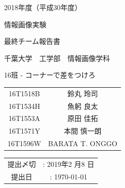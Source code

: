 


\begin{titlepage}
	\centering
	{\Large 2018年度（平成30年度） \par
	\Huge 情報画像実験 \par
	\Large 最終チーム報告書 \par}
	
	\vspace{5cm}
	{\LARGE 千葉大学　工学部　情報画像学科\par
	\Large 16班 - コーナーで差をつけろ\par
	
	\begin{table}[!h]
	\centering
	\large
	\begin{tabular}{cc}
	16T1518B & 鈴丸 玲司 \\
	16T1534H & 魚躬 良太 \\
	16T1553A & 原田 佳拓 \\
	16T1571Y & 本間 慎一朗\\
	16T1596W & BARATA T. ONGGO \\
	\end{tabular}
	\end{table}}
	\vfill
	{
	\begin{table}[!h]
	\centering
	\Large
	\begin{tabular}{cc}
	提出〆切 & : 2019年2 月8 日 \\
	提出日 & : {\today} \\
	\end{tabular}
	\end{table}}
\end{titlepage}

\tableofcontents
\clearpage

